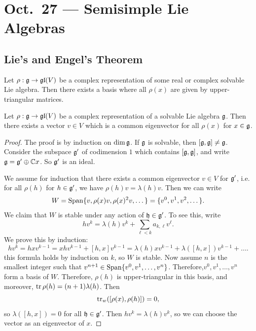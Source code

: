 \chapter{Oct.~27 --- Semisimple Lie Algebras}

\section{Lie's and Engel's Theorem}

\begin{theorem}\label{thm:lies-theorem}
  Let $\rho : \mathfrak{g} \to \mathfrak{gl}(V)$ be a complex
  representation of some real or
  complex solvable Lie algebra. Then there
  exists a basis where all $\rho(x)$ 
  are given by upper-triangular matrices.
\end{theorem}

\begin{prop}\label{prop:common-eigenvector}
  Let $\rho : \mathfrak{g} \to \mathfrak{gl}(V)$ be a complex
  representation of a solvable Lie algebra
  $\mathfrak{g}$. Then there exists a vector $v \in V$ 
  which is a common eigenvector for all
  $\rho(x)$ for $x \in \mathfrak{g}$.
\end{prop}

\begin{proof}
  The proof is by induction on $\dim \mathfrak{g}$.
  If $\mathfrak{g}$ is solvable, then $[\mathfrak{g}, \mathfrak{g}] \ne \mathfrak{g}$.
  Consider the subspace $\mathfrak{g}'$ of
  codimension $1$ which contains
  $[\mathfrak{g}, \mathfrak{g}]$, and
  write $\mathfrak{g} = \mathfrak{g}' \oplus \mathbb{C} x$. So $\mathfrak{g}'$
  is an ideal. 

  We assume for induction that there exists
  a common eigenvector $v \in V$ for $\mathfrak{g}'$, i.e.
  for all $\rho(h)$ for $h \in \mathfrak{g}'$, we have
  $\rho(h)v = \lambda(h)v$. Then we can write
  \[
    W = \operatorname{Span}\{v, \rho(x) v, \rho(x)^2 v, \dots\}
    = \{v^0, v^1, v^2, \dots\}.
  \]
  We claim that $W$ is stable
  under any action of $\mathfrak{h} \in \mathfrak{g}'$. To see
  this, write
  \[
    hv^k = \lambda(h) v^k
    + \sum_{\ell < k} a_{k, \ell} v^\ell.
  \]
  We prove this by induction:
  \[
    hv^k = hxv^{k - 1}
    = xhv^{k - 1} + [h, x] v^{k - 1}
    = \lambda(h) x v^{k - 1}
    + \lambda ([h, x]) v^{k - 1} + \dots.
  \]
  this formula holds by induction on $k$,
  so $W$ is stable.
  Now assume $n$ is the smallest integer
  such that $v^{n + 1} \in \operatorname{Span}\{v^0, v^1, \dots, v^n\}$.
  Therefore,$v^0, v^1, \dots, v^n$ 
  form a basis of $W$. Therefore,
  $\rho(h)$ is upper-triangular
  in this basis, and moreover,
  $\operatorname{tr} \rho(h) = (n + 1) \lambda(h)$. Then
  \[
    \operatorname{tr}_w([\rho(x), \rho(h)]) = 0,
  \]
  so $\lambda([h, x]) = 0$ for all $\mathfrak{h} \in \mathfrak{g}'$.
  Then $h v^k = \lambda(h) v^k$, so we
  can choose the vector as an eigenvector
  of $x$.
\end{proof}


